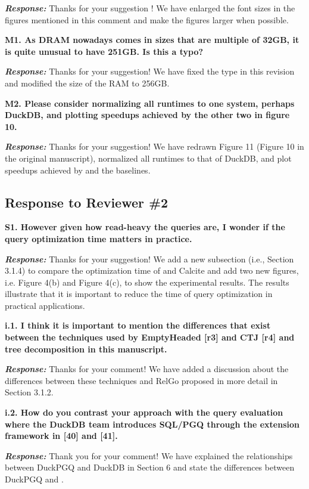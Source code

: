 \textbf{\textit{Response: }}
Thanks for your suggestion ! We have enlarged the font sizes in the figures mentioned in this comment and make the figures larger when possible.


\textbf{M1. As DRAM nowadays comes in sizes that are multiple of 32GB, it is quite unusual to have 251GB. Is this a typo?}

\textbf{\textit{Response: }}
Thanks for your suggestion! We have fixed the type in this revision and modified the size of the RAM to 256GB.

\textbf{M2. Please consider normalizing all runtimes to one system, perhaps DuckDB, and plotting speedups achieved by the other two in figure 10.}

\textbf{\textit{Response: }}
Thanks for your suggestion! We have redrawn Figure 11 (Figure 10 in the original manuscript), normalized all runtimes to that of DuckDB, and plot speedups achieved by \name and the baselines.


\subsection{Response to Reviewer \#2}

\textbf{S1. However given how read-heavy the queries are, I wonder if the query optimization time matters in practice.}

\textbf{\textit{Response: }}
Thanks for your suggestion! We add a new subsection (i.e., Section 3.1.4) to compare the optimization time of \name and Calcite and add two new figures, i.e. Figure 4(b) and Figure 4(c), to show the experimental results.
The results illustrate that it is important to reduce the time of query optimization in practical applications. 



\textbf{
i.1. I think it is important to mention the differences that exist between the techniques used by EmptyHeaded [r3] and CTJ [r4]  and tree decomposition in this manuscript.}

\textbf{\textit{Response: }}
Thanks for your comment! We have added a discussion about the differences between these techniques and RelGo proposed in more detail in Section 3.1.2.


\textbf{i.2. How do you contrast your approach with the query evaluation where the DuckDB team introduces SQL/PGQ through the extension framework in [40] and [41].}

\textbf{\textit{Response: }}
Thank you for your comment! We have explained the relationships between DuckPGQ and DuckDB in Section 6 and state the differences between DuckPGQ and \name.



